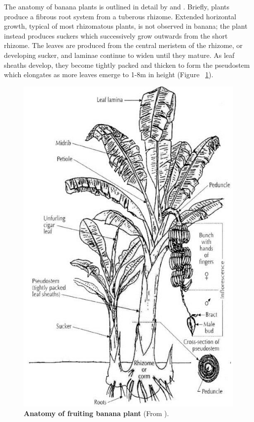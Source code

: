 The anatomy of banana plants is outlined in detail by \textcite{Bakry2009} and \textcite{Robinson2010}. Briefly, plants produce a fibrous root system from a tuberous rhizome. Extended horizontal growth, typical of most rhizomatous plants, is not observed in banana; the plant instead produces suckers which successively grow outwards from the short rhizome. The leaves are produced from the central meristem of the rhizome, or developing sucker, and laminae continue to widen until they mature. As leaf sheaths develop, they become tightly packed and thicken to form the pseudostem which elongates as more leaves emerge to 1-8m in height \parencite{Bakry2009} (Figure ~\ref{fig:Anatomy of fruiting banana plant}). 

\begin{figure}[hp!]
    \centering
    \includegraphics[width=12cm]{Figures/Diagrammatic-representation-of-a-fruiting-banana-plant-with-suckers-in-Bakry-et-al_W640.jpg}
    \caption[Anatomy of fruiting banana plant]{\textbf{Anatomy of fruiting banana plant} (From \parencite{Bakry2009}).}
    \label{fig:Anatomy of fruiting banana plant}
\end{figure}

